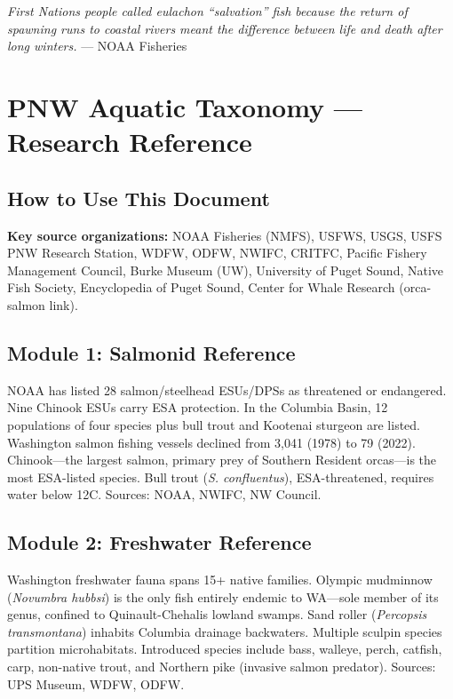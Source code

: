 \documentclass[11pt,letterpaper]{article}
\newcommand{\stageheader}[2]{\noindent\colorbox{#2}{\makebox[\textwidth][l]{\textcolor{white}{\bfseries\sffamily\hspace{6pt}#1\hspace{6pt}}}}\vspace{0.5em}\par}
\begin{document}
\begin{quotebox}
\textit{First Nations people called eulachon ``salvation'' fish because the return of spawning runs to coastal rivers meant the difference between life and death after long winters.} --- NOAA Fisheries
\end{quotebox}

\newpage

\stageheader{STAGE 2 --- RESEARCH REFERENCE}{secondary}

\section{PNW Aquatic Taxonomy --- Research Reference}

\subsection{How to Use This Document}

\textbf{Key source organizations:} NOAA Fisheries (NMFS), USFWS, USGS, USFS PNW Research Station, WDFW, ODFW, NWIFC, CRITFC, Pacific Fishery Management Council, Burke Museum (UW), University of Puget Sound, Native Fish Society, Encyclopedia of Puget Sound, Center for Whale Research (orca-salmon link).

\subsection{Module 1: Salmonid Reference}

NOAA has listed 28 salmon/steelhead ESUs/DPSs as threatened or endangered. Nine Chinook ESUs carry ESA protection. In the Columbia Basin, 12 populations of four species plus bull trout and Kootenai sturgeon are listed. Washington salmon fishing vessels declined from 3,041 (1978) to 79 (2022). Chinook---the largest salmon, primary prey of Southern Resident orcas---is the most ESA-listed species. Bull trout (\textit{S. confluentus}), ESA-threatened, requires water below 12\textdegree C. Sources: NOAA, NWIFC, NW Council.

\subsection{Module 2: Freshwater Reference}

Washington freshwater fauna spans 15+ native families. Olympic mudminnow (\textit{Novumbra hubbsi}) is the only fish entirely endemic to WA---sole member of its genus, confined to Quinault-Chehalis lowland swamps. Sand roller (\textit{Percopsis transmontana}) inhabits Columbia drainage backwaters. Multiple sculpin species partition microhabitats. Introduced species include bass, walleye, perch, catfish, carp, non-native trout, and Northern pike (invasive salmon predator). Sources: UPS Museum, WDFW, ODFW.
\end{document}
